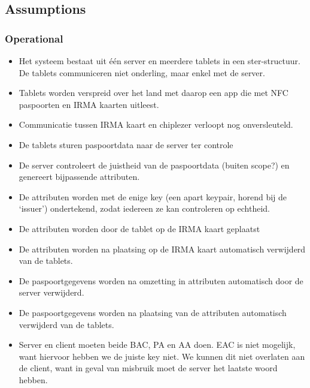 \subsection{Assumptions}
\label{sec:assumptions}
\subsubsection{Operational}
\begin{itemize}
  \item Het systeem bestaat uit één server en meerdere tablets in een ster-structuur. De tablets communiceren niet onderling, maar enkel met de server.
  \item Tablets worden verspreid over het land met daarop een app die met NFC paspoorten en IRMA kaarten uitleest.
  \item Communicatie tussen IRMA kaart en chiplezer verloopt nog onversleuteld.
  \item De tablets sturen paspoortdata naar de server ter controle
  \item De server controleert de juistheid van de paspoortdata (buiten scope?) en genereert bijpassende attributen. 
  \item De attributen worden met de enige key (een apart keypair, horend bij de `issuer') ondertekend, zodat iedereen ze kan controleren op echtheid.
  \item De attributen worden door de tablet op de IRMA kaart geplaatst
  \item De attributen worden na plaatsing op de IRMA kaart automatisch verwijderd van de tablets.
  \item De paspoortgegevens worden na omzetting in attributen automatisch door de server verwijderd.
  \item De paspoortgegevens worden na plaatsing van de attributen automatisch verwijderd van de tablets.
  \item Server en client moeten beide BAC, PA en AA doen. EAC is niet mogelijk, want hiervoor hebben we de juiste key niet. We kunnen dit niet overlaten aan de client, want in geval van misbruik moet de server het laatste woord hebben.
\end{itemize}

